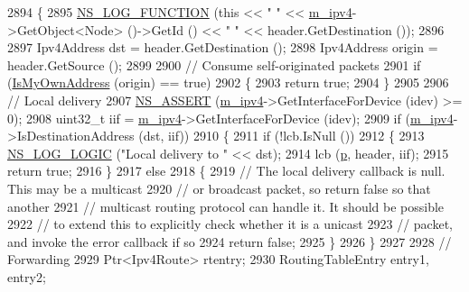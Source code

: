 \begin{DoxyCode}
2894 \{
2895   \hyperlink{log-macros-disabled_8h_a90b90d5bad1f39cb1b64923ea94c0761}{NS\_LOG\_FUNCTION} (\textcolor{keyword}{this} << \textcolor{stringliteral}{" "} << \hyperlink{classns3_1_1olsr_1_1RoutingProtocol_afede79b25ec57e797ff900ae01bca1df}{m\_ipv4}->GetObject<Node> ()->GetId () << \textcolor{stringliteral}{" "} << 
      header.GetDestination ());
2896 
2897   Ipv4Address dst = header.GetDestination ();
2898   Ipv4Address origin = header.GetSource ();
2899 
2900   \textcolor{comment}{// Consume self-originated packets}
2901   \textcolor{keywordflow}{if} (\hyperlink{classns3_1_1olsr_1_1RoutingProtocol_a651b14b759452a21133cde6ef0f2f873}{IsMyOwnAddress} (origin) == \textcolor{keyword}{true})
2902     \{
2903       \textcolor{keywordflow}{return} \textcolor{keyword}{true};
2904     \}
2905 
2906   \textcolor{comment}{// Local delivery}
2907   \hyperlink{assert_8h_a6dccdb0de9b252f60088ce281c49d052}{NS\_ASSERT} (\hyperlink{classns3_1_1olsr_1_1RoutingProtocol_afede79b25ec57e797ff900ae01bca1df}{m\_ipv4}->GetInterfaceForDevice (idev) >= 0);
2908   uint32\_t iif = \hyperlink{classns3_1_1olsr_1_1RoutingProtocol_afede79b25ec57e797ff900ae01bca1df}{m\_ipv4}->GetInterfaceForDevice (idev);
2909   \textcolor{keywordflow}{if} (\hyperlink{classns3_1_1olsr_1_1RoutingProtocol_afede79b25ec57e797ff900ae01bca1df}{m\_ipv4}->IsDestinationAddress (dst, iif))
2910     \{
2911       \textcolor{keywordflow}{if} (!lcb.IsNull ())
2912         \{
2913           \hyperlink{group__logging_ga88acd260151caf2db9c0fc84997f45ce}{NS\_LOG\_LOGIC} (\textcolor{stringliteral}{"Local delivery to "} << dst);
2914           lcb (\hyperlink{lte__link__budget_8m_ac9de518908a968428863f829398a4e62}{p}, header, iif);
2915           \textcolor{keywordflow}{return} \textcolor{keyword}{true};
2916         \}
2917       \textcolor{keywordflow}{else}
2918         \{
2919           \textcolor{comment}{// The local delivery callback is null.  This may be a multicast}
2920           \textcolor{comment}{// or broadcast packet, so return false so that another}
2921           \textcolor{comment}{// multicast routing protocol can handle it.  It should be possible}
2922           \textcolor{comment}{// to extend this to explicitly check whether it is a unicast}
2923           \textcolor{comment}{// packet, and invoke the error callback if so}
2924           \textcolor{keywordflow}{return} \textcolor{keyword}{false};
2925         \}
2926     \}
2927 
2928   \textcolor{comment}{// Forwarding}
2929   Ptr<Ipv4Route> rtentry;
2930   RoutingTableEntry entry1, entry2;

\end{DoxyCode}
